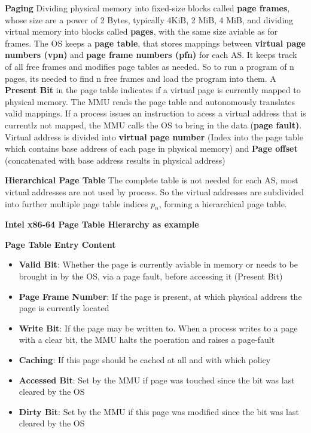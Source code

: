 \documentclass[11pt,a4paper]{article}
\begin{document}
	\textbf{Paging} \newline
	Dividing physical memory into fixed-size blocks called \textbf{page frames}, whose size are a power of 2 Bytes, typically 4KiB, 2 MiB, 4 MiB, and dividing virtual memory into blocks called \textbf{pages}, with the same size aviable as for frames. The OS keeps a \textbf{page table}, that stores mappings between \textbf{virtual page numbers (vpn)} and \textbf{page frame numbers (pfn)} for each AS. It keeps track of all free frames and modifies page tables as needed. So to run a program of n pages, its needed to find n free frames and load the program into them. \newline
	A \textbf{Present Bit} in the page table indicates if a virtual page is currently mapped to physical memory. The MMU reads the page table and autonomously translates valid mappings. If a process issues an instruction to acess a virtual address that is currentlz not mapped, the MMU calls the OS to bring in the data (\textbf{page fault)}. \newline
	Virtual address is divided into \textbf{virtual page number} (Index into the page table which contains base address of each page in physical memory) and \textbf{Page offset} (concatenated with base address results in physical address)\newline
	
	\textbf{Hierarchical Page Table}\newline 
	The complete table is not needed for each AS, most virtual addresses are not used by process. So the virtual addresses are subdivided into further multiple page table indices $p_n$, forming a hierarchical page table.
	
	\textbf{Intel x86-64 Page Table Hierarchy as example} \newline
	
	\textbf{Page Table Entry Content}
	\begin{itemize}
		\item \textbf{Valid Bit}: Whether the page is currently aviable in memory or needs to be brought in by the OS, via a page fault, before accessing it (Present Bit)
		\item \textbf{Page Frame Number}: If the page is present, at which physical address the page is currently located
		\item \textbf{Write Bit}: If the page may be written to. When a process writes to a page with a clear bit, the MMU halts the poeration and raises a page-fault
		\item \textbf{Caching}: If this page should be cached at all and with which policy
		\item \textbf{Accessed Bit}: Set by the MMU if page was touched since the bit was last cleared by the OS
		\item \textbf{Dirty Bit}: Set by the MMU if this page was modified since the bit was last cleared by the OS
	\end{itemize}
	
\end{document}
